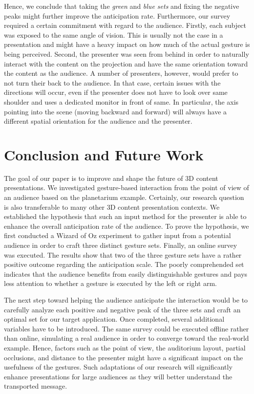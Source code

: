 \documentclass{sigchi}
\begin{document}
Hence, we conclude that taking the \textit{green} and \textit{blue sets} and fixing the negative peaks might further improve the anticipation rate. Furthermore, our survey required a certain commitment with regard to the audience. Firstly, each subject was exposed to the same angle of vision. This is usually not the case in a presentation and might have a heavy impact on how much of the actual gesture is being perceived. Second, the presenter was seen from behind in order to naturally interact with the content on the projection and have the same orientation toward the content as the audience. A number of presenters, however, would prefer to not turn their back to the audience. In that case, certain issues with the directions will occur, even if the presenter does not have to look over same shoulder and uses a dedicated monitor in front of same. In particular, the axis pointing into the scene (moving backward and forward) will always have a different spatial orientation for the audience and the presenter.


\section{Conclusion and Future Work}

The goal of our paper is to improve and shape the future of 3D content presentations. We investigated gesture-based interaction from the point of view of an audience based on the planetarium example. Certainly, our research question is also transferable to many other 3D content presentation contexts. We established the hypothesis that such an input method for the presenter is able to enhance the overall anticipation rate of the audience. To prove the hypothesis, we first conducted a Wizard of Oz experiment to gather input from a potential audience in order to craft three distinct gesture sets. Finally, an online survey was executed. The results show that two of the three gesture sets have a rather positive outcome regarding the anticipation scale. The poorly comprehended set indicates that the audience benefits from easily distinguishable gestures and pays less attention to whether a gesture is executed by the left or right arm.

The next step toward helping the audience anticipate the interaction would be to carefully analyze each positive and negative peak of the three sets and craft an optimal set for our target application. Once completed, several additional variables have to be introduced. The same survey could be executed offline rather than online, simulating a real audience in order to converge toward the real-world example. Hence, factors such as the point of view, the auditorium layout, partial occlusions, and distance to the presenter might have a significant impact on the usefulness of the gestures. Such adaptations of our research will significantly enhance presentations for large audiences as they will better understand the transported message.
\end{document}
